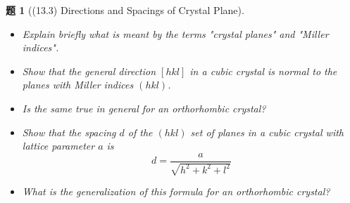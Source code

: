 \documentclass[UTF8,10pt,a4paper]{article}
\theoremstyle{Problem}
\newtheorem{prob}{题}
\theoremstyle{Solution}
\begin{document}
\begin{prob}[(13.3) Directions and Spacings of Crystal Plane]
    \begin{itemize}
        \item[$\triangleright\ddagger$] Explain briefly what is meant by the terms "crystal planes" and "Miller indices".
        \item[$\triangleright$] Show that the general direction $[hkl]$ in a cubic crystal is normal to the planes with Miller indices $(hkl)$.
        \item[$\triangleright$] Is the same true in general for an orthorhombic crystal?
        \item[$\triangleright$] Show that the spacing $d$ of the $(hkl)$ set of planes in a cubic crystal with lattice parameter $a$ is
        \[
            d=\frac{a}{\sqrt{h^2+k^2+l^2}}
        \]
        \item[$\triangleright$] What is the generalization of this formula for an orthorhombic crystal?
    \end{itemize}
\end{prob}
\end{document}
